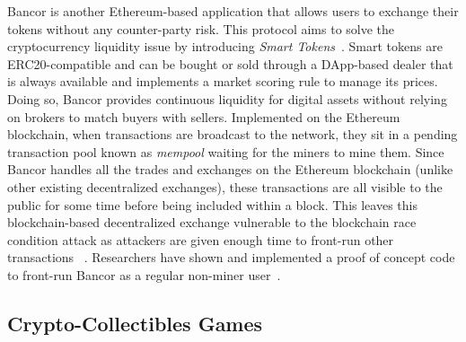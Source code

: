 
Bancor is another Ethereum-based application that allows users to exchange their tokens without any counter-party risk. This protocol aims to solve the cryptocurrency liquidity issue by introducing \textit{Smart Tokens}~\cite{hertzog2017bancor}. Smart tokens are ERC20-compatible and can be bought or sold through a DApp-based dealer that is always available and implements a market scoring rule to manage its prices. Doing so, Bancor provides continuous liquidity for digital assets without relying on brokers to match buyers with sellers. Implemented on the Ethereum blockchain, when transactions are broadcast to the network, they sit in a pending transaction pool known as \textit{mempool} waiting for the miners to mine them. Since Bancor handles all the trades and exchanges on the Ethereum blockchain (unlike other existing decentralized exchanges), these transactions are all visible to the public for some time before being included within a block. This leaves this blockchain-based decentralized exchange vulnerable to the blockchain race condition attack as attackers are given enough time to front-run other transactions ~\cite{BancorIs7:online}. Researchers have shown and implemented a proof of concept code to front-run Bancor as a regular non-miner user~\cite{NewTab13:online}.


\subsection{Crypto-Collectibles Games}

